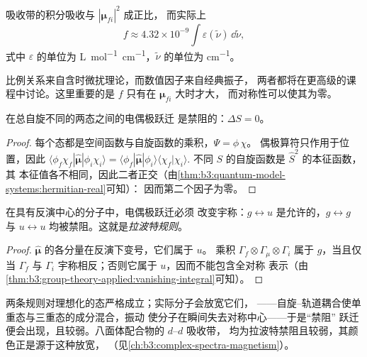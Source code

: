 \begin{proposition}[吸收强度与振子强度]\label{prop:b3:electronic-spectroscopy:intensity}
吸收带的积分吸收与 $|\boldsymbol\mu_{fi}|^2$ 成正比，
而实际上
\[
f \approx 4.32\times10^{-9}\int\varepsilon(\tilde\nu)\,\dd\tilde\nu,
\]
式中 $\varepsilon$ 的单位为 \unit{L.mol^{-1}.cm^{-1}}，$\tilde\nu$ 的单位为 \unit{cm^{-1}}。
\end{proposition}
\admitted

比例关系来自含时微扰理论，而数值因子来自经典振子，
两者都将在更高级的课程中讨论。这里重要的是
$f$ 只有在 $\boldsymbol\mu_{fi}$ 大时才大，
而对称性可以使其为零。

\begin{theorem}[自旋选择定则]\label{thm:b3:electronic-spectroscopy:spin-rule}
在总自旋不同的两态之间的电偶极跃迁
是禁阻的：$\Delta S = 0$。
\end{theorem}

\begin{proof}
每个态都是空间函数与自旋函数的乘积，$\Psi = \phi\,\chi$。
偶极算符只作用于位置，因此 $\langle\phi_f\chi_f|\hat{\boldsymbol\mu}|
\phi_i\chi_i\rangle = \langle\phi_f|\hat{\boldsymbol\mu}|\phi_i\rangle\langle\chi_f|\chi_i\rangle$.
不同 $S$ 的自旋函数是 $\hat S^2$ 的本征函数，其
本征值各不相同，因此二者正交（由\cref{thm:b3:quantum-model-systems:hermitian-real}可知）：
因而第二个因子为零。
\end{proof}

\begin{theorem}[拉波特规则]\label{thm:b3:electronic-spectroscopy:laporte}
在具有反演中心的分子中，电偶极跃迁必须
改变宇称：$g \leftrightarrow u$ 是允许的，$g \leftrightarrow g$ 与 $u
\leftrightarrow u$ 均被禁阻。这就是\emph{拉波特规则}。
\end{theorem}

\begin{proof}
$\hat{\boldsymbol\mu}$ 的各分量在反演下变号，它们属于 $u$。
乘积 $\Gamma_f\otimes\Gamma_\mu\otimes\Gamma_i$ 属于 $g$，当且仅当 $\Gamma_f$ 与 $\Gamma_i$
宇称相反；否则它属于 $u$，因而不能包含全对称
表示（由\cref{thm:b3:group-theory-applied:vanishing-integral}可知）。
\end{proof}

两条规则对理想化的态严格成立；实际分子会放宽它们，
——自旋–轨道耦合使单重态与三重态的成分混合，振动
使分子在瞬间失去对称中心——于是“禁阻”
跃迁便会出现，且较弱。八面体配合物的 $d$--$d$ 吸收带，
均为拉波特禁阻且较弱，其颜色正是源于这种放宽，
（见\cref{ch:b3:complex-spectra-magnetism}）。

